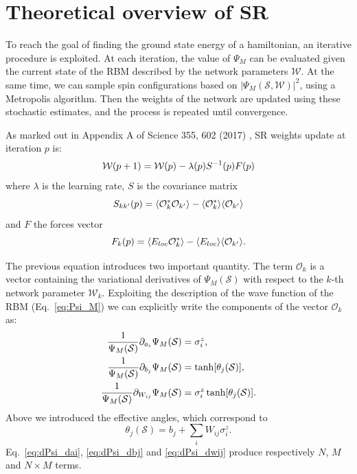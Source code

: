 \documentclass[a4paper,11pt]{article}
\begin{document}
\section{Theoretical overview of SR}

To reach the goal of finding the ground state energy of a hamiltonian, an iterative procedure is exploited. At each iteration, the value of $\Psi_M$ can be evaluated given the current state of the RBM described by the network parameters $\mathcal{W}$. At the same time, we can sample spin configurations based on $|\Psi_M (\mathcal{S}, \mathcal{W})|^2$, using a Metropolis algorithm. Then the weights of the network are updated using these stochastic estimates, and the process is repeated until convergence.

As marked out in Appendix A of Science 355, 602 (2017) \cite{Carleo_2017}, SR weights update at iteration $p$ is:
\begin{equation}
    \label{eq:update}
    \centering
    \mathcal{W}(p+1)= \mathcal{W}(p) - \lambda(p) S^{-1}(p) F(p)
\end{equation}
where $\lambda$ is the learning rate, $S$ is the covariance matrix
\begin{equation}
    \label{eq:cov_mat}
    \centering
    S_{kk'}(p)= \langle \mathcal{O}^*_k \mathcal{O}_{k'} \rangle -\langle \mathcal{O}^*_k \rangle \langle \mathcal{O}_{k'} \rangle
\end{equation}
and $F$ the forces vector
\begin{equation}
    \label{eq:forces}
    \centering
    F_{k}(p)= \langle E_{loc} \mathcal{O}^*_k  \rangle -\langle E_{loc} \rangle \langle \mathcal{O}_{k'} \rangle.
\end{equation}

The previous equation introduces two important quantity. The term $\mathcal{O}_k$ is a vector containing the variational derivatives of $\Psi_M(\mathcal{S})$ with respect to the $k$-th network parameter $\mathcal{W}_k$. Exploiting the description of the wave function of the RBM (Eq.~\ref{eq:Psi_M}) we can explicitly write the components of the vector $\mathcal{O}_k$ as:
\begin{align}
    \centering
    \label{eq:dPsi_dai}
    \frac{1}{\Psi_M(\mathcal{S})} \partial _{a_i} \Psi_M(\mathcal{S}) &= \sigma _i ^z, \\
    \label{eq:dPsi_dbj}
    \frac{1}{\Psi_M(\mathcal{S})} \partial _{b_j} \Psi_M(\mathcal{S}) &= \tanh[\theta_j (\mathcal{S})], \\
    \label{eq:dPsi_dwij}
    \frac{1}{\Psi_M(\mathcal{S})} \partial _{W_{ij}} \Psi_M(\mathcal{S}) &= \sigma _i ^z \tanh[\theta_j (\mathcal{S})].
\end{align}
%
Above we introduced the effective angles, which correspond to
\begin{equation}
    \theta_j(\mathcal{S})=  b_j + \sum_i W_{ij} \sigma_i^z.
\end{equation}
%
Eq.~\ref{eq:dPsi_dai}, \ref{eq:dPsi_dbj} and \ref{eq:dPsi_dwij} produce respectively $N$, $M$ and $N \times M$ terms.
\end{document}
